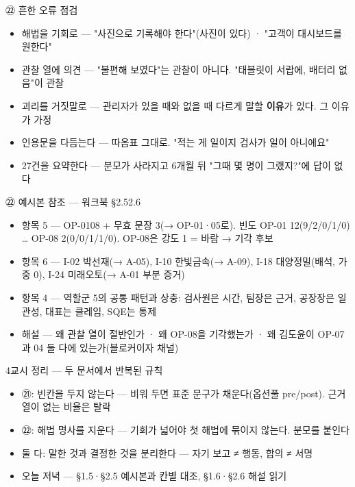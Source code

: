 \begin{frame}{㉒ 흔한 오류 점검}
\begin{itemize}
\item 해법을 기회로 — "사진으로 기록해야 한다"(사진이 있다) · "고객이 대시보드를 원한다"
\item 관찰 열에 의견 — "불편해 보였다"는 관찰이 아니다. "태블릿이 서랍에, 배터리 없음"이 관찰
\item 괴리를 거짓말로 — 관리자가 있을 때와 없을 때 다르게 말할 \textbf{이유}가 있다. 그 이유가 가정
\item 인용문을 다듬는다 — 따옴표 그대로. "적는 게 일이지 검사가 일이 아니에요"
\item 27건을 요약한다 — 분모가 사라지고 6개월 뒤 "그때 몇 명이 그랬지?"에 답이 없다
\end{itemize}
\end{frame}

\begin{frame}{㉒ 예시본 참조 — 워크북 §2.5\til{}2.6}
\begin{itemize}
\item 항목 5 — OP-01\til{}08 + 무효 문장 3(→ OP-01·05로). 빈도 OP-01 12(9/2/0/1/0) … OP-08 2(0/0/1/1/0). OP-08은 강도 1 = 바람 → 기각 후보
\item 항목 6 — I-02 박선재(→ A-05), I-10 한빛금속(→ A-09), I-18 대양정밀(배석, 가중 0), I-24 미래오토(→ A-01 부분 증거)
\item 항목 4 — 역할군 5의 공통 패턴과 상충: 검사원은 시간, 팀장은 근거, 공장장은 일관성, 대표는 클레임, SQE는 통제
\item 해설 — 왜 관찰 열이 절반인가 · 왜 OP-08을 기각했는가 · 왜 김도윤이 OP-07과 04 둘 다에 있는가(블로커이자 채널)
\end{itemize}
\end{frame}

\begin{frame}{4교시 정리 — 두 문서에서 반복된 규칙}
\begin{itemize}
\item ㉑: 빈칸을 두지 않는다 — 비워 두면 표준 문구가 채운다(옵션풀 pre/post). 근거 열이 없는 비율은 탈락
\item ㉒: 해법 명사를 지운다 — 기회가 넓어야 첫 해법에 묶이지 않는다. 분모를 붙인다
\item 둘 다: 말한 것과 결정한 것을 분리한다 — 자기 보고 ≠ 행동, 합의 ≠ 서명
\item 오늘 저녁 — §1.5·§2.5 예시본과 칸별 대조, §1.6·§2.6 해설 읽기
\end{itemize}
\end{frame}

